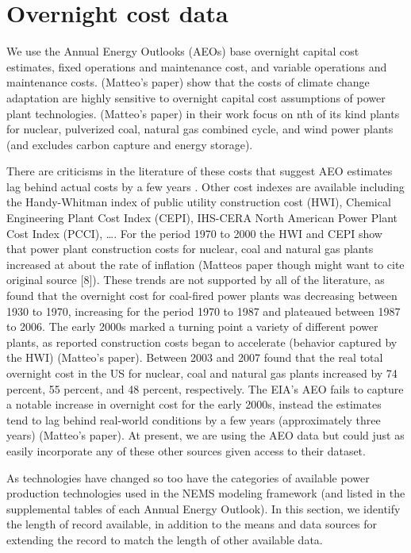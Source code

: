 \documentclass[10pt]{report}
\begin{document}
\chapter{Overnight cost data}\label{overnight}
We use the Annual Energy Outlooks (AEOs) base overnight capital cost estimates, fixed operations and maintenance cost, and variable operations and maintenance costs. 
\cite{} (Matteo's paper) show that the costs of climate change adaptation are highly sensitive to overnight capital cost assumptions of power plant technologies. 
\cite{} (Matteo's paper) in their work focus on nth of its kind plants for nuclear, pulverized coal, natural gas combined cycle, and wind power plants (and excludes carbon capture and energy storage). 

There are criticisms in the literature of these costs that suggest AEO estimates lag behind actual costs by a few years \parencite{}.
Other cost indexes are available including the Handy-Whitman index of public utility construction cost (HWI), Chemical Engineering Plant Cost Index (CEPI), IHS-CERA North American Power Plant Cost Index (PCCI), \ldots.
For the period 1970 to 2000 the HWI and CEPI show that power plant construction costs for nuclear, coal and natural gas plants increased at about the rate of inflation \parencite{} (Matteos paper though might want to cite original source [8]). 
These trends are not supported by all of the literature, as \cite{} found that the overnight cost for coal-fired power plants was decreasing between 1930 to 1970, increasing for the period 1970 to 1987 and plateaued between 1987 to 2006. 
The early 2000s marked a turning point a variety of different power plants, as reported construction costs began to accelerate (behavior captured by the HWI) \parencite{} (Matteo's paper). 
Between 2003 and 2007 \cite{du2009update} found that the real total overnight cost in the US for nuclear, coal and natural gas plants increased by 74 percent, 55 percent, and 48 percent, respectively. 
The EIA's AEO fails to capture a notable increase in overnight cost for the early 2000s, instead the estimates tend to lag behind real-world conditions by a few years (approximately three years) \parencite{}(Matteo's paper).
At present, we are using the AEO data but could just as easily incorporate any of these other sources given access to their dataset. 
  
As technologies have changed so too have the categories of available power production technologies used in the NEMS modeling framework (and listed in the supplemental tables of each Annual Energy Outlook). 
In this section, we identify the length of record available, in addition to the means and data sources for extending the record to match the length of other available data. 
\end{document}
